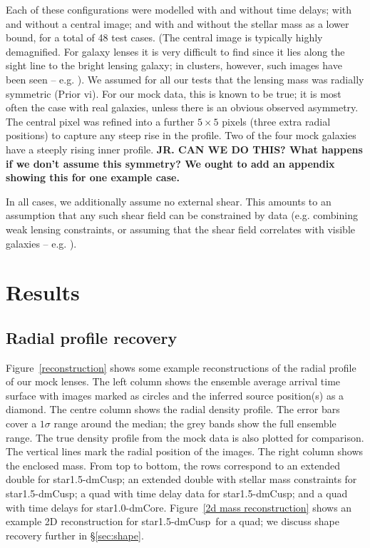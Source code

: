 \documentclass[galley,usenatbib]{mn2e}
\newcommand{\hilight}[1]{{\bf \color{red} #1}}
\newcommand{\figref}[1] {Figure~\ref{#1}}
\newcommand{\mockAA}{{\sc star1.0-dmCore}}
\newcommand{\mockBC}{{\sc star1.5-dmCusp}}
\begin{document}
Each of these configurations were modelled with and without time delays; with
and without a central image; and with and without the stellar mass as a lower
bound, for a total of 48 test cases. (The central image is typically highly
demagnified. For galaxy lenses it is very difficult to find since it lies along
the sight line to the bright lensing galaxy; in clusters, however, such images
have been seen -- e.g. \citealt{2005PASJ...57L...7I}). We assumed for all our tests that the
lensing mass was radially symmetric (Prior vi). For our mock data, this is
known to be true; it is most often the case with real galaxies, unless there is
an obvious observed asymmetry. The central pixel was refined into a further
$5\times5$ pixels (three extra radial positions) to capture any steep rise in
the profile.  Two of the four mock galaxies have a steeply rising inner
profile. \hilight{JR.  CAN WE DO THIS? What happens if we don't assume this symmetry? We ought
to add an appendix showing this for one example case.}

In all cases, we additionally assume no external shear. This amounts to an assumption that any such shear field can be constrained by data (e.g. combining weak lensing constraints, or assuming that the shear field correlates with visible galaxies -- e.g. \citealt{2009A&A...500..681M,2011ApJ...726...84W}).

\section{Results}\label{sec:results}

\subsection{Radial profile recovery}

\figref{reconstruction} shows some example reconstructions of the radial profile of our mock lenses. The left
column shows the ensemble average arrival time surface with images marked as
circles and the inferred source position(s) as a diamond. The centre column shows
the radial density profile. The error bars cover a $1\sigma$ range around the
median; the grey bands show the full ensemble range. The true density profile from the mock data is also plotted for
comparison. The vertical lines mark the radial position of the images. The
right column shows the enclosed mass. From top to bottom, the rows correspond to an extended double for \mockBC; an extended double with stellar mass constraints for \mockBC; a quad with time delay data for \mockBC; and a quad with time delays for \mockAA. \figref{2d mass reconstruction} shows an example 2D reconstruction for \mockBC\ for a quad; we discuss shape recovery further in \S\ref{sec:shape}.
\end{document}
